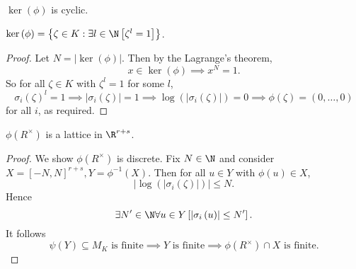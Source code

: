 \documentclass[pmath441]{subfiles}
\begin{document}
    \begin{cor}{}
        $\ker\left( \phi \right)$ is cyclic.
    \end{cor}	

    
    \begin{prop}{}
        $\ker\left( \phi \right) = \left\lbrace \zeta\in K: \exists l\in\N\left[ \zeta^l=1 \right] \right\rbrace$.
    \end{prop}

    \begin{proof}
        Let $N=\left| \ker\left( \phi \right) \right|$. Then by the Lagrange's theorem,
        \begin{equation*}
            x\in\ker\left( \phi \right) \implies x^N = 1.
        \end{equation*}
        So for all $\zeta\in K$ with $\zeta^l=1$ for some $l$,
        \begin{equation*}
            \sigma_i\left( \zeta \right)^l = 1 \implies \left| \sigma_i\left( \zeta \right) \right| = 1 \implies \log\left( \left| \sigma_i\left( \zeta \right) \right| \right) = 0 \implies \phi\left( \zeta \right) = \left( 0,\ldots,0 \right)
        \end{equation*}
        for all $i$, as required.
    \end{proof}

    \begin{prop}{}
        $\phi\left( R^{\times} \right)$ is a lattice in $\R^{r+s}$.
    \end{prop}

    \begin{proof}
        We show $\phi\left( R^{\times} \right)$ is discrete. Fix $N\in\N$ and consider $X=\left[ -N,N \right]^{r+s}, Y = \phi^{-1}\left( X \right)$. Then for all $u\in Y$ with $\phi\left( u \right)\in X$,
        \begin{equation*}
            \left| \log\left( \left| \sigma_i\left( \zeta \right) \right| \right) \right| \leq N.
        \end{equation*}
        Hence
        \begin{equation*}
            \exists N'\in\N\forall u\in Y\left[ \left| \sigma_i\left( u \right) \right|\leq N' \right].
        \end{equation*}
        It follows
        \begin{equation*}
            \psi\left( Y \right)\subseteq M_K \text{ is finite} \implies Y \text{ is finite} \implies \phi\left( R^\times \right)\cap X\text{ is finite}.
        \end{equation*}
    \end{proof}
    
\end{document}
